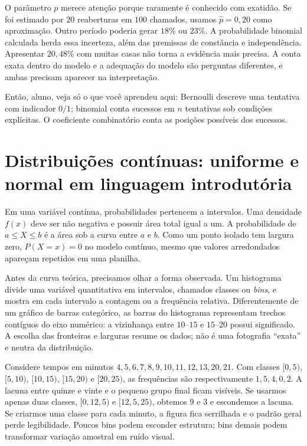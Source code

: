 O parâmetro $p$ merece atenção porque raramente é conhecido com exatidão. Se foi estimado por $20$ reaberturas em $100$ chamados, usamos $\hat p=0{,}20$ como aproximação. Outro período poderia gerar $18\%$ ou $23\%$. A probabilidade binomial calculada herda essa incerteza, além das premissas de constância e independência. Apresentar $20{,}48\%$ com muitas casas não torna a evidência mais precisa. A conta exata dentro do modelo e a adequação do modelo são perguntas diferentes, e ambas precisam aparecer na interpretação.

\begin{SummaryBox}
Então, aluno, veja só o que você aprendeu aqui: Bernoulli descreve uma tentativa com indicador $0/1$; binomial conta sucessos em $n$ tentativas sob condições explícitas. O coeficiente combinatório conta as posições possíveis dos sucessos.
\end{SummaryBox}

\section[Distribuições uniforme e normal]{Distribuições contínuas: uniforme e normal em linguagem introdutória}

Em uma variável contínua, probabilidades pertencem a intervalos. Uma densidade $f(x)$ deve ser não negativa e possuir área total igual a um. A probabilidade de $a\leq X\leq b$ é a área sob a curva entre $a$ e $b$. Como um ponto isolado tem largura zero, $P(X=x)=0$ no modelo contínuo, mesmo que valores arredondados apareçam repetidos em uma planilha.

Antes da curva teórica, precisamos olhar a forma observada. Um histograma divide uma variável quantitativa em intervalos, chamados classes ou \textit{bins}, e mostra em cada intervalo a contagem ou a frequência relativa. Diferentemente de um gráfico de barras categórico, as barras do histograma representam trechos contíguos do eixo numérico: a vizinhança entre $10$--$15$ e $15$--$20$ possui significado. A escolha das fronteiras e larguras resume os dados; não é uma fotografia ``exata'' e neutra da distribuição.

Considere tempos em minutos $4,5,6,7,8,9,10,11,12,13,20,21$. Com classes $[0,5)$, $[5,10)$, $[10,15)$, $[15,20)$ e $[20,25)$, as frequências são respectivamente $1,5,4,0,2$. A lacuna entre quinze e vinte e o pequeno grupo final ficam visíveis. Se usarmos apenas duas classes, $[0,12{,}5)$ e $[12{,}5,25)$, obtemos $9$ e $3$ e escondemos a lacuna. Se criarmos uma classe para cada minuto, a figura fica serrilhada e o padrão geral perde legibilidade. Poucos bins podem esconder estrutura; bins demais podem transformar variação amostral em ruído visual.


